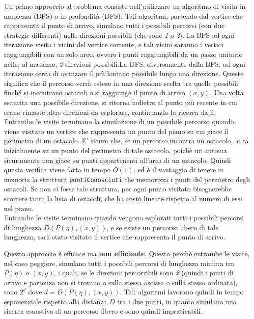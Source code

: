 \documentclass[a4paper,11pt]{article}
\begin{document}
Un primo approccio al problema consiste nell'utilizzare un algoritmo di visita in ampiezza (BFS) o in profondità (DFS). Tali algoritmi, partendo dal vertice che rappresenta il punto di arrivo, simulano tutti i possibili percorsi (con due strategie differenti) nelle direzioni possibili (che sono \textit{1} o \textit{2}). La BFS ad ogni iterazione visita i vicini del vertice corrente, e tali vicini saranno i vertici raggiungibili con un solo arco, ovvero i punti raggiungibili da un passo unitario nelle, al massimo, \textit{2} direzioni possibili.La DFS, diversamente dalla BFS, ad ogni iterazione cerca di avanzare il più lontano possibile lungo una direzione. Questo significa che il percorso verrà esteso in una direzione scelta tra quelle possibili finché si incontrano ostacoli o si raggiunge il punto di arrivo $(x, y)$. Una volta esaurita una possibile direzione, si ritorna indietro al punto più recente in cui erano rimaste altre direzioni da esplorare, continuando la ricerca da lì.\\
Entrambe le visite terminano la simulazione di un possibile percorso quando viene visitato un vertice che rappresenta un punto del piano su cui giace il perimetro di un ostacolo. E' sicuro che, se un percorso incontra un ostacolo, lo fa inizialmente su un punto del perimetro di tale ostacolo, poichè un automa sicuramente non giace su punti appartenenti all'area di un ostacolo. Quindi questa verifica viene fatta in tempo $O(1)$, ed è il vantaggio di tenere in memoria la struttura \texttt{puntiConosciuti} che memorizza i punti del perimetro degli ostacoli. Se non ci fosse tale struttura, per ogni punto visitato bisognerebbe scorrere tutta la lista di ostacoli, che ha costo lineare rispetto al numero di essi nel piano. \\
Entrambe le visite terminano quando vengono esplorati tutti i possibili percorsi di lunghezza $D(P(\eta), (x, y))$, e se esiste un percorso libero di tale lunghezza, sarà stato visitato il vertice che rappresenta il punto di arrivo. 

Questo approccio è efficace ma \textbf{non efficiente}. Questo perchè entrambe le visite, nel caso peggiore, simulano tutti i possibili percorsi di lunghezza minima tra $P(\eta)$ e $(x, y)$, i quali, se le direzioni percorribili sono \textit{2} (quindi i punti di arrivo e partenza non si trovano o sulla stessa ascissa o sulla stessa ordinata), sono $2^d$ dove $d = D(P(\eta), (x, y))$. Tali algoritmi lavorano quindi in tempo esponenziale rispetto alla distanza $D$ tra i due punti, in quanto simulano una ricerca esaustiva di un percorso libero e sono quindi impraticabili. 
\end{document}
